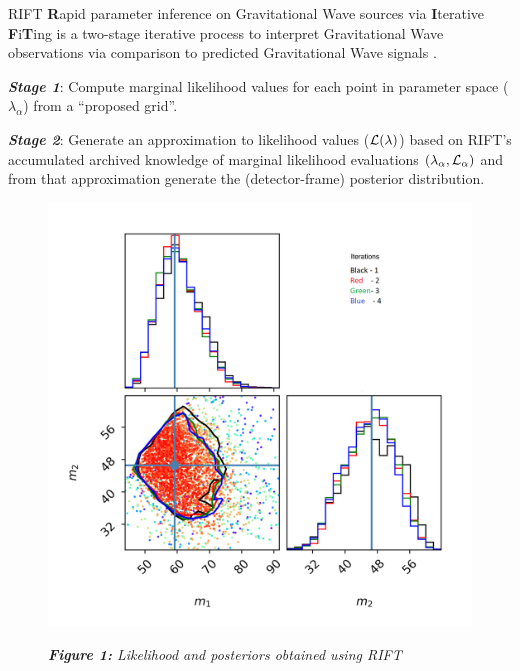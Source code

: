 \documentclass[serif]{beamer}
\begin{document}
\begin{frame}{}
\begin{columns}
\begin{column}[T]{.3\textwidth}
\begin{block}{RIFT}
\textbf{R}apid parameter inference on Gravitational Wave sources via \textbf{I}terative \textbf{F}i\textbf{T}ing
is a two-stage iterative process to interpret Gravitational Wave observations via comparison to predicted Gravitational Wave signals \cite{Lange2018RapidAA}.
\vspace{1em}

\textbf{\emph{Stage 1}}: Compute marginal likelihood values for each point in parameter space ($\lambda_\alpha$) from a ``proposed grid''.
\vspace{0.1em}

\textbf{\emph{Stage 2}}: Generate an approximation to likelihood values (${\cal L}(\lambda)$) based on RIFT's
accumulated archived knowledge of marginal likelihood evaluations 
$(\lambda_\alpha,{\cal L}_\alpha)$ and from that approximation generate the (detector-frame) posterior distribution.




\begin{center}
	\begin{figure}
	\includegraphics[scale=1.0]{Images/corner_m1_m2}
	\vspace{-1.0em}
	
	\small{\emph{\textbf{Figure 1:} Likelihood and posteriors obtained using RIFT}}
	\end{figure}


\end{center}
\end{block}
\end{column}
\end{columns}
\end{frame}
\end{document}
